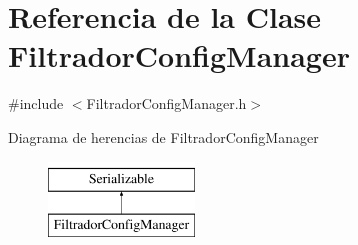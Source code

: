 \hypertarget{classFiltradorConfigManager}{\section{\-Referencia de la \-Clase \-Filtrador\-Config\-Manager}
\label{classFiltradorConfigManager}
}


{\ttfamily \#include $<$\-Filtrador\-Config\-Manager.\-h$>$}

\-Diagrama de herencias de \-Filtrador\-Config\-Manager\begin{figure}[H]
\begin{center}
\leavevmode
\includegraphics[height=2.000000cm]{classFiltradorConfigManager}
\end{center}
\end{figure}
